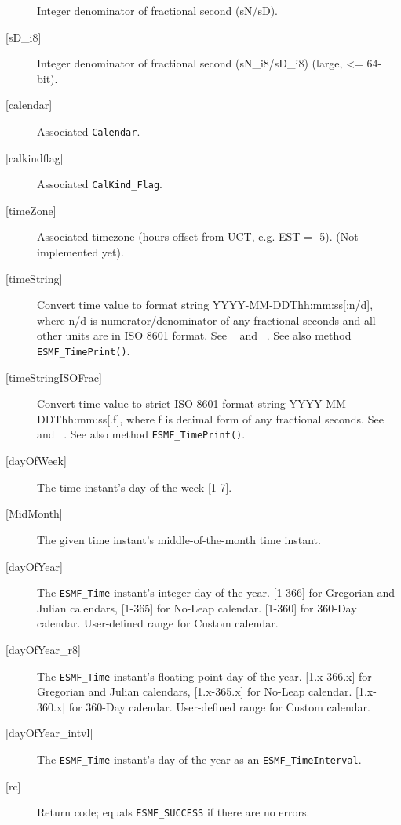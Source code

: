 \begin{description}
            Integer denominator of fractional second (sN/sD).
       \item[{[sD\_i8]}]
            Integer denominator of fractional second (sN\_i8/sD\_i8)
                                                             (large, <= 64-bit).
       \item[{[calendar]}]
            Associated {\tt Calendar}.
       \item[{[calkindflag]}]
            Associated {\tt CalKind\_Flag}.
       \item[{[timeZone]}]
            Associated timezone (hours offset from UCT, e.g. EST = -5).
            (Not implemented yet).
       \item[{[timeString]}]
            \begin{sloppypar}
            Convert time value to format string YYYY-MM-DDThh:mm:ss[:n/d],
            where n/d is numerator/denominator of any fractional seconds and
            all other units are in ISO 8601 format.  See ~\cite{ISO} and
            ~\cite{ISOnotes}.  See also method {\tt ESMF\_TimePrint()}.
            \end{sloppypar}
       \item[{[timeStringISOFrac]}]
            Convert time value to strict ISO 8601 format string
            YYYY-MM-DDThh:mm:ss[.f], where f is decimal form of any fractional
            seconds.  See ~\cite{ISO} and ~\cite{ISOnotes}.  See also method
            {\tt ESMF\_TimePrint()}.
       \item[{[dayOfWeek]}]
            The time instant's day of the week [1-7].
       \item[{[MidMonth]}]
            The given time instant's middle-of-the-month time instant.
       \item[{[dayOfYear]}]
            The {\tt ESMF\_Time} instant's integer day of the year.
            [1-366] for Gregorian and Julian calendars, [1-365] for No-Leap
            calendar.  [1-360] for 360-Day calendar.  User-defined range
            for Custom calendar.
       \item[{[dayOfYear\_r8]}]
            The {\tt ESMF\_Time} instant's floating point day of the year.
            [1.x-366.x] for Gregorian and Julian calendars, [1.x-365.x] for
            No-Leap calendar.  [1.x-360.x] for 360-Day calendar.  User-defined
            range for Custom calendar.
       \item[{[dayOfYear\_intvl]}]
            The {\tt ESMF\_Time} instant's day of the year as an
            {\tt ESMF\_TimeInterval}.
       \item[{[rc]}]
            Return code; equals {\tt ESMF\_SUCCESS} if there are no errors.
       \end{description}
   

